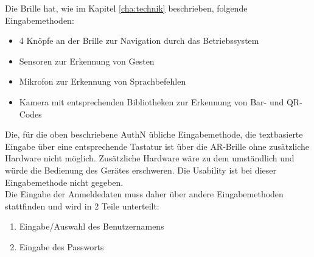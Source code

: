Die Brille hat, wie im Kapitel \ref{cha:technik} beschrieben, folgende Eingabemethoden:
\begin{itemize}
	\item 4 Knöpfe an der Brille zur Navigation durch das Betriebssystem
	\item Sensoren zur Erkennung von Gesten
	\item Mikrofon zur Erkennung von Sprachbefehlen
	\item Kamera mit entsprechenden Bibliotheken zur Erkennung von Bar- und QR-Codes
\end{itemize}
Die, für die oben beschriebene \acf{AuthN} übliche Eingabemethode, die textbasierte Eingabe über eine entsprechende Tastatur ist über die \ac{AR}-Brille ohne zusätzliche Hardware nicht möglich. Zusätzliche Hardware wäre zu dem umständlich und würde die Bedienung des Gerätes erschweren. Die Usability ist bei dieser Eingabemethode nicht gegeben.\\

Die Eingabe der Anmeldedaten muss daher über andere Eingabemethoden stattfinden und wird in 2 Teile unterteilt:
\begin{enumerate}
	\item Eingabe/Auswahl des Benutzernamens
	\item Eingabe des Passworts
\end{enumerate}

